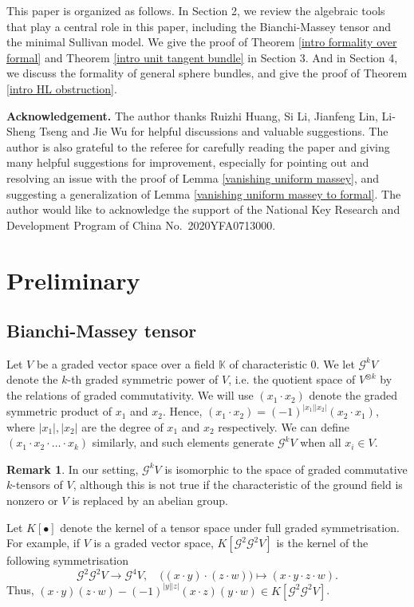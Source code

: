 \documentclass{article}
\theoremstyle{plain}
\theoremstyle{definition}
\newtheorem{rmk}[thm]{Remark}
\theoremstyle{plain}
\numberwithin{equation}{section}
\begin{document}
This paper is organized as follows. In Section 2, we review the algebraic tools that play a central role in this paper, including the Bianchi-Massey tensor and the minimal Sullivan model.  We give the proof of Theorem \ref{intro formality over formal} and  Theorem \ref{intro unit tangent bundle} in Section 3. And in Section 4, we discuss the formality of general sphere bundles, and give the proof of Theorem \ref{intro HL obstruction}. 

\textbf{Acknowledgement.} The author thanks Ruizhi Huang, Si Li, Jianfeng Lin, Li-Sheng Tseng and Jie Wu for helpful discussions and valuable suggestions. The author is also grateful to the referee for carefully reading the paper and giving many helpful suggestions for improvement, especially for pointing out and resolving an issue with the proof of Lemma \ref{vanishing uniform massey}, and suggesting a generalization of Lemma \ref{vanishing uniform massey to formal}. The author would like to acknowledge the support of the National Key Research and Development Program of China No.~2020YFA0713000.

\section{Preliminary}

\subsection{Bianchi-Massey tensor}
Let $V$ be a graded vector space over a field $\mathbb{K}$ of characteristic 0. We let $\mathcal{G}^kV$ denote the $k$-th graded symmetric power of $V$, i.e. the quotient space of $V^{\otimes k}$ by the relations of graded commutativity. We will use $(x_1\cdot x_2)$ denote the graded symmetric product of $x_1$ and $x_2$. Hence, $(x_1\cdot x_2)=(-1)^{|x_1||x_2|}(x_2\cdot x_1)$, where $|x_1|,|x_2|$ are the degree of $x_1$ and $x_2$ respectively. We can define $(x_1\cdot x_2\cdot \ldots\cdot x_k)$ similarly, and such elements generate $\mathcal{G}^kV$ when all $x_i\in V$.

\begin{rmk}
In our setting, $\mathcal{G}^kV$ is isomorphic to the space of graded commutative $k$-tensors of $V$, although this is not true if the characteristic of the ground field is nonzero or $V$ is replaced by an abelian group.
\end{rmk}

Let $K[\bullet]$ denote the kernel of a tensor space under full graded symmetrisation. For example, if $V$ is a graded vector space, $K[\mathcal{G}^2\mathcal{G}^2V]$ is the kernel of the following symmetrisation
$$
\mathcal{G}^2\mathcal{G}^2V\to \mathcal{G}^4V,\quad \big( (x\cdot y) \cdot (z\cdot w) \big) \mapsto (x\cdot y\cdot z\cdot w).
$$
Thus, $(x\cdot y)(z\cdot w)-(-1)^{|y||z|}(x\cdot z)(y\cdot w)\in K[\mathcal{G}^2\mathcal{G}^2V]$.
\end{document}
